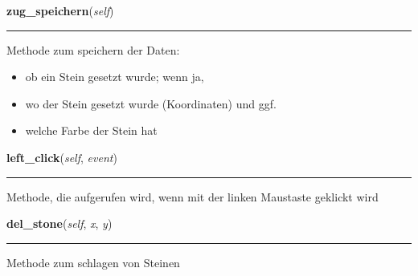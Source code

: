 \hspace{.8\funcindent}\begin{boxedminipage}{\funcwidth}

    \raggedright \textbf{zug\_speichern}(\textit{self})

    \vspace{-1.5ex}

    \rule{\textwidth}{0.5\fboxrule}
\setlength{\parskip}{2ex}
    Methode zum speichern der Daten:

    \begin{itemize}
    \setlength{\parskip}{0.6ex}
      \item ob ein Stein gesetzt wurde; wenn ja,

      \item wo der Stein gesetzt wurde (Koordinaten) und ggf.

      \item welche Farbe der Stein hat

    \end{itemize}

\setlength{\parskip}{1ex}
    \end{boxedminipage}

    \label{Main:main:mainGUI:left_click}

    \vspace{0.5ex}

\hspace{.8\funcindent}\begin{boxedminipage}{\funcwidth}

    \raggedright \textbf{left\_click}(\textit{self}, \textit{event})

    \vspace{-1.5ex}

    \rule{\textwidth}{0.5\fboxrule}
\setlength{\parskip}{2ex}
    Methode, die aufgerufen wird, wenn mit der linken Maustaste geklickt 
    wird

\setlength{\parskip}{1ex}
    \end{boxedminipage}

    \label{Main:main:mainGUI:del_stone}

    \vspace{0.5ex}

\hspace{.8\funcindent}\begin{boxedminipage}{\funcwidth}

    \raggedright \textbf{del\_stone}(\textit{self}, \textit{x}, \textit{y})

    \vspace{-1.5ex}

    \rule{\textwidth}{0.5\fboxrule}
\setlength{\parskip}{2ex}
    Methode zum schlagen von Steinen

\setlength{\parskip}{1ex}
    \end{boxedminipage}


